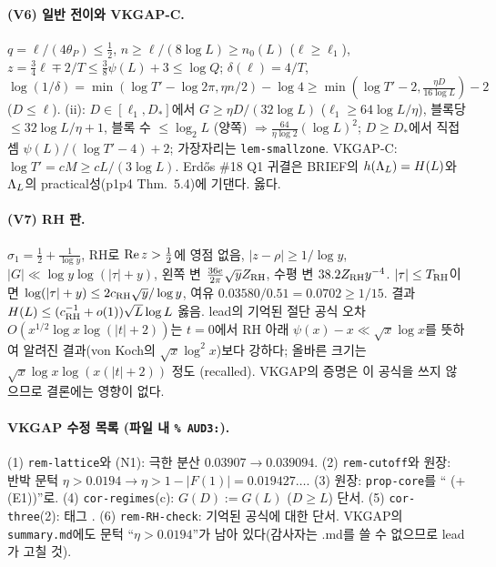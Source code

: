 \paragraph{(V6) 일반 전이와 VKGAP-C.}
$q=\ell/(4\theta_P)\le\frac12$, $n\ge\ell/(8\log L)\ge n_0(L)$ ($\ell\ge\ell_1$), $z=\frac34\ell\mp2/T\le\frac38\psi(L)+3\le\log Q$; $\delta(\ell)=4/T$,
$\log(1/\delta)=\min(\log T'-\log2\pi,\eta n/2)-\log4\ge\min(\log T'-2,\frac{\eta D}{16\log L})-2$ ($D\le\ell$).
(ii): $D\in[\ell_1,D_*]$에서 $G\ge\eta D/(32\log L)$ ($\ell_1\ge64\log L/\eta$), 블록당 $\le32\log L/\eta+1$, 블록 수 $\le\log_2L$ (양쪽) $\Rightarrow\frac{64}{\eta\log2}(\log L)^2$;
$D\ge D_*$에서 직접 셈 $\psi(L)/(\log T'-4)+2$; 가장자리는 \texttt{lem-smallzone}. VKGAP-C: $\log T'=cM\ge cL/(3\log L)$.
Erdős \#18 Q1 귀결은 BRIEF의 $h(\Lambda_L)=H(L)$와 $\Lambda_L$의 practical성(p1p4 Thm.~5.4)에 기댄다. 옳다.

\paragraph{(V7) RH 판.}
$\sigma_1=\frac12+\frac1{\log y}$, RH로 ${\rm Re}\,z>\frac12$에 영점 없음, $|z-\rho|\ge1/\log y$, $|G|\ll\log y\log(|\tau|+y)$, 왼쪽 변 $\frac{36e}{2\pi}\sqrt y Z_{\rm RH}$, 수평 변 $38.2Z_{\rm RH}y^{-4}$.
$|\tau|\le T_{\rm RH}$이면 $\log(|\tau|+y)\le2c_{\rm RH}\sqrt y/\log y$, 여유 $0.03580/0.51=0.0702\ge1/15$. 결과 $H(L)\le(c_{\rm RH}^{-1}+o(1))\sqrt L\log L$ 옳음.
lead의 기억된 절단 공식 오차 $O(x^{1/2}\log x\log(|t|+2))$는 $t=0$에서 RH 아래 $\psi(x)-x\ll\sqrt x\log x$를 뜻하여 알려진 결과(von Koch의 $\sqrt x\log^2x$)보다 강하다; 올바른 크기는
$\sqrt x\log x\log(x(|t|+2))$ 정도 (recalled). VKGAP의 증명은 이 공식을 쓰지 않으므로 결론에는 영향이 없다.

\paragraph{VKGAP 수정 목록 (파일 내 \texttt{\% AUD3:}).}
(1) \texttt{rem-lattice}와 (N1): 극한 분산 $0.03907\to0.039094$. (2) \texttt{rem-cutoff}와 원장: 반박 문턱 $\eta>0.0194\to\eta>1-|F(1)|=0.019427\ldots$.
(3) 원장: \texttt{prop-core}를 ``\PROVED{} (+(E1))''로. (4) \texttt{cor-regimes}(c): $G(D):=G(L)$ ($D\ge L$) 단서. (5) \texttt{cor-three}(2): 태그 .
(6) \texttt{rem-RH-check}: 기억된 공식에 대한 단서. VKGAP의 \texttt{summary.md}에도 문턱 ``$\eta>0.0194$''가 남아 있다(감사자는 .md를 쓸 수 없으므로 lead가 고칠 것).

